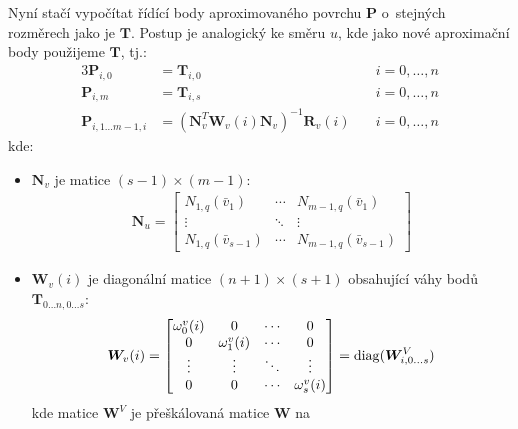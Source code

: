 Nyní stačí vypočítat řídící body aproximovaného povrchu $\bm{P}$ o~stejných rozměrech
jako je $\bm{T}$.
Postup je analogický ke směru $u$, kde jako nové aproximační body použijeme
$\bm{T}$, tj.:
\begin{alignat}{3}
    \bm{P}_{i, 0}                 & = \bm{T}_{i, 0}                                   & \quad i = 0, \ldots, n \\
    \bm{P}_{i, m}                 & = \bm{T}_{i, s}                                   & \quad i = 0, \ldots, n \\
    \bm{P}_{i, 1 \ldots m - 1, i} & = (\bm{N}_v^T\bm{W}_v(i)\bm{N}_v)^{-1}\bm{R}_v(i) & \quad i = 0, \ldots, n
\end{alignat}
kde:
\begin{itemize}
    \item $\bm{N}_v$ je matice $(s - 1) \times (m - 1)$:
          \begin{align}
              \bm{N}_u =
              \begin{bmatrix}
                  N_{1,q}(\bar{v}_1)        & \cdots & N_{m-1,q}(\bar{v}_1)     \\
                  \vdots                    & \ddots & \vdots                   \\
                  N_{1, q}(\bar{v}_{s - 1}) & \cdots & N_{m-1,q}(\bar{v}_{s-1})
              \end{bmatrix}
          \end{align}
    \item $\bm{W}_v(i)$ je diagonální matice $(n + 1)\times(s + 1)$ obsahující váhy
          bodů $\bm{T}_{0\ldots n, 0\ldots s}$:
          \begin{align}
              \bm{W}_v(i)
              = \begin{bmatrix}
                    \omega^v_0(i) & 0             & \cdots & 0               \\
                    0             & \omega^v_1(i) & \cdots & 0               \\
                    \vdots        & \vdots        & \ddots & \vdots          \\
                    0             & 0             & \cdots & \omega^v_{s}(i)
                \end{bmatrix}
              = \operatorname{diag}(\bm{W}^V_{i, 0\ldots s})
          \end{align}
          kde matice $\bm{W}^V$ je přeškálovaná matice $\bm{W}$ na

\end{itemize}
